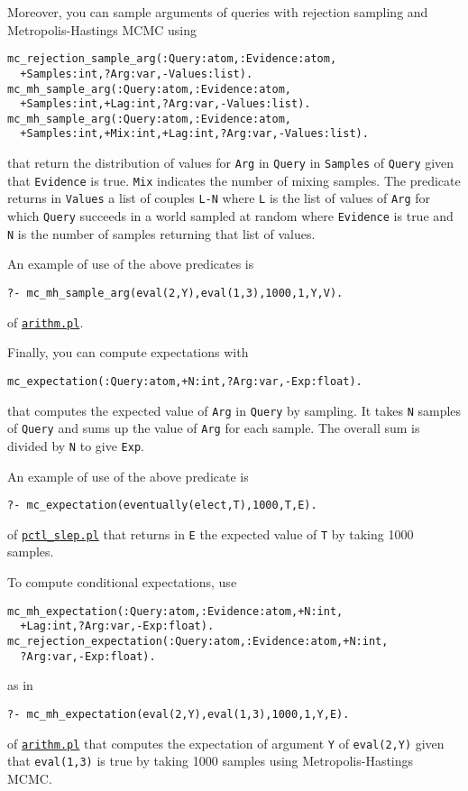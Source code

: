 Moreover, you can sample arguments of queries with rejection sampling and Metropolis-Hastings MCMC using
\begin{verbatim}
mc_rejection_sample_arg(:Query:atom,:Evidence:atom,
  +Samples:int,?Arg:var,-Values:list).
mc_mh_sample_arg(:Query:atom,:Evidence:atom,
  +Samples:int,+Lag:int,?Arg:var,-Values:list).
mc_mh_sample_arg(:Query:atom,:Evidence:atom,
  +Samples:int,+Mix:int,+Lag:int,?Arg:var,-Values:list).
\end{verbatim}
that return the distribution of values for \verb|Arg| in \verb|Query| in \verb|Samples| of
\verb|Query| given that \verb|Evidence| is true. \verb|Mix| indicates the
number of mixing samples.
The predicate returns in \verb|Values| a list of couples \verb|L-N| where
\verb|L| is the list of values of \verb|Arg| for which \verb|Query|
succeeds in a world sampled at random where \verb|Evidence| is true and \verb|N|
is the number of samples returning that list of values.

An example of use of the above predicates is
\begin{verbatim}
?- mc_mh_sample_arg(eval(2,Y),eval(1,3),1000,1,Y,V).
\end{verbatim}
of \href{http://cplint.lamping.unife.it/example/inference/arithm.pl}{\texttt{arithm.pl}}.

Finally, you can compute expectations with 
\begin{verbatim}
mc_expectation(:Query:atom,+N:int,?Arg:var,-Exp:float).
\end{verbatim}
that computes the expected value of \verb|Arg| in \verb|Query| by
sampling.
It takes \verb|N| samples of \verb|Query| and sums up the value of \verb|Arg| for
each sample. The overall sum is divided by \verb|N| to give \verb|Exp|.

An example of use of the above predicate is
\begin{verbatim}
?- mc_expectation(eventually(elect,T),1000,T,E).
\end{verbatim}
of \href{http://cplint.lamping.unife.it/example/inference/pctl_slep.pl}{\texttt{pctl\_slep.pl}}
that returns in \verb|E| the expected value of \verb|T| by taking 1000 samples.

To compute conditional expectations, use
\begin{verbatim}
mc_mh_expectation(:Query:atom,:Evidence:atom,+N:int,
  +Lag:int,?Arg:var,-Exp:float).
mc_rejection_expectation(:Query:atom,:Evidence:atom,+N:int,
  ?Arg:var,-Exp:float).
\end{verbatim}
as in
\begin{verbatim}
?- mc_mh_expectation(eval(2,Y),eval(1,3),1000,1,Y,E).
\end{verbatim}
of \href{http://cplint.lamping.unife.it/example/inference/arithm.pl}{\texttt{arithm.pl}}
that computes the expectation of argument \verb|Y| of \verb|eval(2,Y)| given that 
\verb|eval(1,3)| is true by taking 1000 samples using Metropolis-Hastings MCMC.

